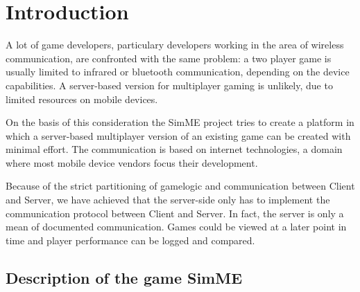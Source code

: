 %
%


\pagestyle{empty}
\sloppy


\begin{abstract}
SimME is a multiplayer game for mobile devices (mobile phones, PDAs, ...)
developed to provide a basis for a gaming forum in which new games can easily
be integrated. The architecture described in this document is targeted on
assisting the implementation of multiplayer games for mobile devices.
\end{abstract}

\section{Introduction}

A lot of game developers, particulary developers working in the area of wireless
communication, are confronted with the same problem: a two player game is
usually limited to infrared or bluetooth communication, depending on the device
capabilities. A server-based version for multiplayer gaming is unlikely, due to
limited resources on mobile devices.

On the basis of this consideration the SimME project tries to create a
platform in which a server-based multiplayer version of an existing game can be
created with minimal effort. The communication is based on internet
technologies, a domain where most mobile device vendors focus their development.

Because of the strict partitioning of gamelogic and communication between Client
and Server, we have achieved that the server-side only has to implement the
communication protocol between Client and Server. In fact, the server is only a
mean of documented communication. Games could be viewed at a later point in time
and player performance can be logged and compared.


\subsection{Description of the game SimME}

